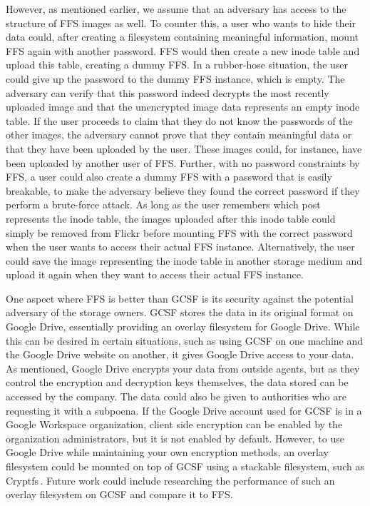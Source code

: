 However, as mentioned earlier, we assume that an adversary has access to the structure of \gls{FFS} images as well. To counter this, a user who wants to hide their data could, after creating a filesystem containing meaningful information, mount \gls{FFS} again with another password. \gls{FFS} would then create a new inode table and upload this table, creating a dummy \gls{FFS}. In a \mbox{rubber-hose} situation, the user could give up the password to the dummy \gls{FFS} instance, which is empty. The adversary can verify that this password indeed decrypts the most recently uploaded image and that the unencrypted image data represents an empty inode table. If the user proceeds to claim that they do not know the passwords of the other images, the adversary cannot prove that they contain meaningful data or that they have been uploaded by the user. These images could, for instance, have been uploaded by another user of \gls{FFS}. Further, with no password constraints by \gls{FFS}, a user could also create a dummy \gls{FFS} with a password that is easily breakable, to make the adversary believe they found the correct password if they perform a \mbox{brute-force} attack. As long as the user remembers which post represents the inode table, the images uploaded after this inode table could simply be removed from Flickr before mounting \gls{FFS} with the correct password when the user wants to access their actual \gls{FFS} instance. Alternatively, the user could save the image representing the inode table in another storage medium and upload it again when they want to access their actual \gls{FFS} instance.

One aspect where \gls{FFS} is better than \gls{GCSF} is its security against the potential adversary of the storage owners. \gls{GCSF} stores the data in its original format on Google Drive, essentially providing an overlay filesystem for Google Drive. While this can be desired in certain situations, such as using \gls{GCSF} on one machine and the Google Drive website on another, it gives Google Drive access to your data. As mentioned, Google Drive encrypts your data from outside agents, but as they control the encryption and decryption keys themselves, the data stored can be accessed by the company. The data could also be given to authorities who are requesting it with a subpoena. If the Google Drive account used for \gls{GCSF} is in a Google Workspace organization, client side encryption can be enabled by the organization administrators, but it is not enabled by default. However, to use Google Drive while maintaining your own encryption methods, an overlay filesystem could be mounted on top of \gls{GCSF} using a stackable filesystem, such as Cryptfs\,\cite{zadokCryptfsStackableVnode1998}. Future work could include researching the performance of such an overlay filesystem on \gls{GCSF} and compare it to \gls{FFS}.

